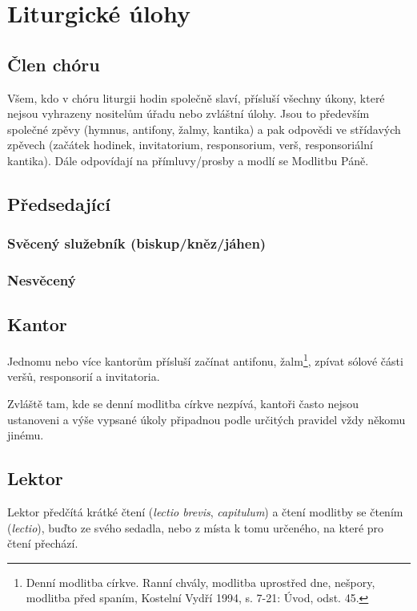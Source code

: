 \section{Liturgické úlohy}

\subsection{Člen chóru}

Všem, kdo v chóru liturgii hodin společně slaví, přísluší všechny úkony,
které nejsou vyhrazeny nositelům úřadu nebo zvláštní úlohy.
Jsou to především společné zpěvy 
(hymnus, antifony, žalmy, kantika)
a pak odpovědi ve střídavých zpěvech (začátek hodinek, invitatorium,
responsorium, verš, responsoriální kantika).
Dále odpovídají na přímluvy/prosby a modlí se Modlitbu Páně.

\subsection{Předsedající}
\subsubsection{Svěcený služebník (biskup/kněz/jáhen)}
\subsubsection{Nesvěcený}

\subsection{Kantor}

Jednomu nebo více kantorům přísluší 
začínat antifonu, žalm\footnote{Denní modlitba církve. Ranní chvály, modlitba uprostřed dne, nešpory, modlitba před spaním, Kostelní Vydří 1994, s. 7-21: Úvod, odst. 45.},
zpívat sólové části veršů, responsorií a invitatoria.

Zvláště tam, kde se denní modlitba církve nezpívá, kantoři často
nejsou ustanoveni a výše vypsané úkoly připadnou podle určitých pravidel
vždy někomu jinému. 

\subsection{Lektor}

Lektor předčítá krátké čtení (\emph{lectio brevis}, \emph{capitulum}) 
a čtení modlitby se čtením (\emph{lectio}), buďto ze svého sedadla,
nebo z místa k tomu určeného, na které pro čtení přechází.

